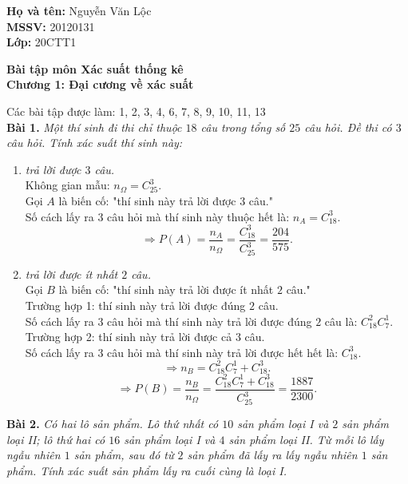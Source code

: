 \documentclass[12pt,a4paper]{article}
\author{Nguyễn Văn Lộc}
\begin{document}
\fancyhf{}
\lhead{}
\chead{}
\rhead{}
\cfoot{}
\rfoot{\thepage}
\lfoot{}
\pagestyle{fancy}
\renewcommand{\headrulewidth}{0pt}
\renewcommand{\footrulewidth}{0pt}
\begin{mybox}
\textbf{Họ và tên:} Nguyễn Văn Lộc\\
\textbf{MSSV:} 20120131\\
\textbf{Lớp:} 20CTT1
\end{mybox}
\begin{center}
\fontsize{16}{14}\selectfont
\textbf{Bài tập môn Xác suất thống kê}\\
\textbf{Chương 1: Đại cương về xác suất}
\end{center}
Các bài tập được làm: 1, 2, 3, 4, 6, 7, 8, 9, 10, 11, 13\\
\textbf{Bài 1.} \textit{Một thí sinh đi thi chỉ thuộc $18$ câu trong tổng số $25$ câu hỏi. Đề thi có $3$ câu hỏi. Tính xác suất thí sinh này:}
\begin{enumerate}[label=(\alph*)]
\item \textit{trả lời được $3$ câu.}\\
Không gian mẫu: $n_{\Omega} = C^3_{25}.$\\
Gọi $A$ là biến cố: "thí sinh này trả lời được $3$ câu."\\
Số cách lấy ra $3$ câu hỏi mà thí sinh này thuộc hết là: $n_A = C^3_{18}.$
$$\Rightarrow P\left( A \right) = \frac{{{n_A}}}{{{n_\Omega }}} = \frac{{C_{18}^3}}{{C_{25}^3}} = \frac{{204}}{{575}}.$$
\item \textit{trả lời được ít nhất $2$ câu.}\\
Gọi $B$ là biến cố: "thí sinh này trả lời được ít nhất $2$ câu."\\
Trường hợp 1: thí sinh này trả lời được đúng $2$ câu.\\
Số cách lấy ra $3$ câu hỏi mà thí sinh này trả lời được đúng $2$ câu là: $C^2_{18} C^1_{7}.$\\
Trường hợp 2: thí sinh này trả lời được cả $3$ câu.\\
Số cách lấy ra $3$ câu hỏi mà thí sinh này trả lời được hết hết là: $C^3_{18}.$\\
$$\Rightarrow n_B = C^2_{18} C^1_{7} + C^3_{18}.$$
$$ \Rightarrow P\left( B \right) = \frac{{{n_B}}}{{{n_\Omega }}} = \frac{{C_{18}^2C_7^1 + C_{18}^3}}{{C_{25}^3}} = \frac{{1887}}{{2300}}.$$
\end{enumerate}
\textbf{Bài 2.} \textit{Có hai lô sản phẩm. Lô thứ nhất có $10$ sản phẩm loại I và $2$ sản phẩm loại II; lô thứ hai có $16$ sản phẩm loại I và $4$ sản phẩm loại II. Từ mỗi lô lấy ngẫu nhiên $1$ sản phẩm, sau đó từ $2$ sản phẩm đã lấy ra lấy ngẫu nhiên $1$ sản phẩm. Tính xác suất sản phẩm lấy ra cuối cùng là loại I.}\\
\end{document}

